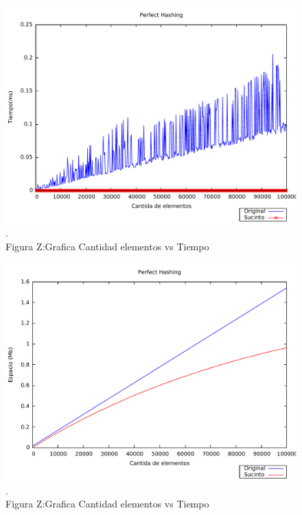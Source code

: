 \documentclass[11pt]{article}
\begin{document}
\begin{center}\begin{figure}[htp]
\centering
\includegraphics[scale=0.5]{1.pdf}
\\
\scriptsize{\color{white}.\color{black}\\Figura Z:Grafica Cantidad elementos vs Tiempo }
\label{etiqueta}
\end{figure}
\end{center}


\begin{center}\begin{figure}[htp]
\centering
\includegraphics[scale=0.5]{2.pdf}
\\
\scriptsize{\color{white}.\color{black}\\Figura Z:Grafica Cantidad elementos vs Tiempo }
\label{etiqueta}
\end{figure}
\end{center}
\end{document}
